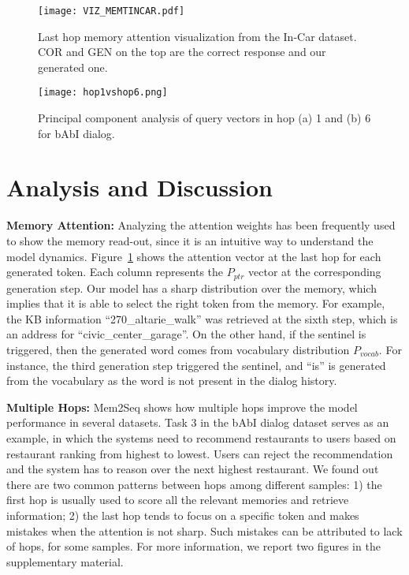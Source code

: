 \documentclass[11pt,a4paper]{article}
\begin{document}
\begin{figure}[t]
\texttt{[image: VIZ\_MEMTINCAR.pdf]}\setlength{\abovecaptionskip}{-5pt} 
\caption{Last hop memory attention visualization from the In-Car dataset. COR and GEN on the top are the correct response and our generated one.}
\label{MEMATT}
\end{figure}

\begin{figure}[t]
\centering
\texttt{[image: hop1vshop6.png]}
\setlength{\abovecaptionskip}{-10pt} 
\caption{Principal component analysis of query vectors in hop (a) 1 and (b) 6 for bAbI dialog.}
\label{FIG:hopsQuery}
\end{figure}

\section{Analysis and Discussion}
\noindent\textbf{Memory Attention:} Analyzing the attention weights has been frequently used to show the memory read-out, since it is an intuitive way to understand the model dynamics. Figure~\ref{MEMATT} shows the attention vector at the last hop for each generated token. Each column represents the $P_{ptr}$ vector at the corresponding generation step. Our model has a sharp distribution over the memory, which implies that it is able to select the right token from the memory. For example, the KB information ``270\_altarie\_walk'' was retrieved at the sixth step, which is an address for ``civic\_center\_garage''. On the other hand, if the sentinel is triggered, then the generated word comes from vocabulary distribution $P_{vocab}$. For instance, the third generation step triggered the sentinel, and ``is'' is generated from the vocabulary as the word is not present in the dialog history. 

\noindent\textbf{Multiple Hops:} Mem2Seq shows how multiple hops improve the model performance in several datasets. Task 3 in the bAbI dialog dataset serves as an example, in which the systems need to recommend restaurants to users based on restaurant ranking from highest to lowest. Users can reject the recommendation and the system has to reason over the next highest restaurant. We found out there are two common patterns between hops among different samples: 1) the first hop is usually used to score all the relevant memories and retrieve information; 2) the last hop tends to focus on a specific token and makes mistakes when the attention is not sharp. Such mistakes can be attributed to lack of hops, for some samples. For more information, we report two figures in the supplementary material. 
\end{document}
